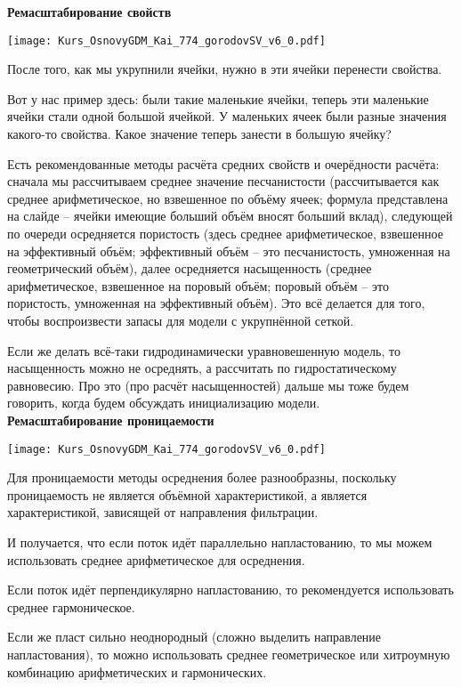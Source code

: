 \textbf{Ремасштабирование свойств}

\texttt{[image: Kurs\_OsnovyGDM\_Kai\_774\_gorodovSV\_v6\_0.pdf]}

После того, как мы укрупнили ячейки, нужно в эти ячейки перенести свойства.

Вот у нас пример здесь: были такие маленькие ячейки, теперь эти маленькие ячейки стали одной большой ячейкой. У маленьких ячеек были разные значения какого-то свойства. Какое значение теперь занести в большую ячейку?

Есть рекомендованные методы расчёта средних свойств и очерёдности расчёта: сначала мы рассчитываем среднее значение песчанистости (рассчитывается как среднее арифметическое, но взвешенное по объёму ячеек; формула представлена на слайде -- ячейки имеющие больший объём вносят больший вклад), следующей по очереди осредняется пористость (здесь среднее арифметическое, взвешенное на эффективный объём; эффективный объём -- это песчанистость, умноженная на геометрический объём), далее осредняется насыщенность (среднее арифметическое, взвешенное на поровый объём; поровый объём -- это пористость, умноженная на эффективный объём).
Это всё делается для того, чтобы воспроизвести запасы для модели с укрупнённой сеткой.

Если же делать всё-таки гидродинамически уравновешенную модель, то насыщенность можно не осреднять, а рассчитать по гидростатическому равновесию.
Про это (про расчёт насыщенностей) дальше мы тоже будем говорить, когда будем обсуждать инициализацию модели.
\\

\textbf{Ремасштабирование проницаемости}

\texttt{[image: Kurs\_OsnovyGDM\_Kai\_774\_gorodovSV\_v6\_0.pdf]}

Для проницаемости методы осреднения более разнообразны, поскольку проницаемость не является объёмной характеристикой, а является характеристикой, зависящей от направления фильтрации.

И получается, что если поток идёт параллельно напластованию, то мы можем использовать среднее арифметическое для осреднения.

Если поток идёт перпендикулярно напластованию, то рекомендуется использовать среднее гармоническое.

Если же пласт сильно неоднородный (сложно выделить направление напластования), то можно использовать среднее геометрическое или хитроумную комбинацию арифметических и гармонических.

